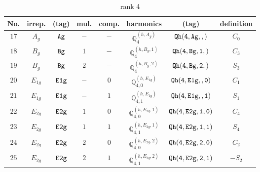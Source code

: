 \documentclass[fleqn,8pt]{jsarticle}
\begin{document}
\begin{table}[ht!]
\begin{center}
\caption{rank 4}
\renewcommand{\arraystretch}{1.3}
\begin{tabular}{cccccccc} \hline \hline
No. & irrep. & (tag) & mul. & comp. & harmonics & (tag) & definition \\ \hline
$ 17 $ & $ A_{g} $ & $ {\tt Ag} $ & $ - $ & $ - $ & $ \mathbb{Q}_{4}^{(h,A_{g})} $ & $ {\tt Qh(4,Ag,,)} $ & $ C_{0} $ \\
$ 18 $ & $ B_{g} $ & $ {\tt Bg} $ & $ 1 $ & $ - $ & $ \mathbb{Q}_{4}^{(h,B_{g},1)} $ & $ {\tt Qh(4,Bg,1,)} $ & $ C_{3} $ \\
$ 19 $ & $ B_{g} $ & $ {\tt Bg} $ & $ 2 $ & $ - $ & $ \mathbb{Q}_{4}^{(h,B_{g},2)} $ & $ {\tt Qh(4,Bg,2,)} $ & $ S_{3} $ \\
$ 20 $ & $ E_{1g} $ & $ {\tt E1g} $ & $ - $ & $ 0 $ & $ \mathbb{Q}_{4,0}^{(h,E_{1g})} $ & $ {\tt Qh(4,E1g,,0)} $ & $ C_{1} $ \\
$ 21 $ & $ E_{1g} $ & $ {\tt E1g} $ & $ - $ & $ 1 $ & $ \mathbb{Q}_{4,1}^{(h,E_{1g})} $ & $ {\tt Qh(4,E1g,,1)} $ & $ S_{1} $ \\
$ 22 $ & $ E_{2g} $ & $ {\tt E2g} $ & $ 1 $ & $ 0 $ & $ \mathbb{Q}_{4,0}^{(h,E_{2g},1)} $ & $ {\tt Qh(4,E2g,1,0)} $ & $ C_{4} $ \\
$ 23 $ & $ E_{2g} $ & $ {\tt E2g} $ & $ 1 $ & $ 1 $ & $ \mathbb{Q}_{4,1}^{(h,E_{2g},1)} $ & $ {\tt Qh(4,E2g,1,1)} $ & $ S_{4} $ \\
$ 24 $ & $ E_{2g} $ & $ {\tt E2g} $ & $ 2 $ & $ 0 $ & $ \mathbb{Q}_{4,0}^{(h,E_{2g},2)} $ & $ {\tt Qh(4,E2g,2,0)} $ & $ C_{2} $ \\
$ 25 $ & $ E_{2g} $ & $ {\tt E2g} $ & $ 2 $ & $ 1 $ & $ \mathbb{Q}_{4,1}^{(h,E_{2g},2)} $ & $ {\tt Qh(4,E2g,2,1)} $ & $ - S_{2} $ \\
 \hline \hline
\end{tabular}
\end{center}
\end{table}
\end{document}
